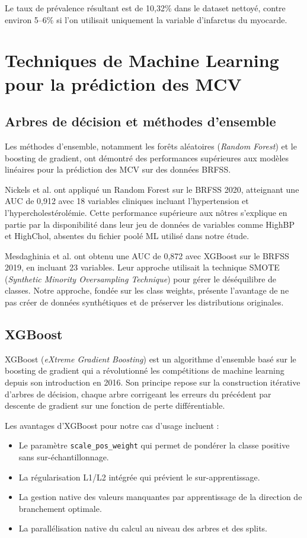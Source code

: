Le taux de prévalence résultant est de 10,32\% dans le dataset nettoyé, contre environ 5--6\% si l'on utilisait uniquement la variable d'infarctus du myocarde.

\section{Techniques de Machine Learning pour la prédiction des MCV}

\subsection{Arbres de décision et méthodes d'ensemble}

Les méthodes d'ensemble, notamment les forêts aléatoires (\textit{Random Forest}) et le boosting de gradient, ont démontré des performances supérieures aux modèles linéaires pour la prédiction des MCV sur des données BRFSS.

Nickels et al. \cite{nickels2023} ont appliqué un Random Forest sur le BRFSS 2020, atteignant une AUC de 0,912 avec 18 variables cliniques incluant l'hypertension et l'hypercholestérolémie. Cette performance supérieure aux nôtres s'explique en partie par la disponibilité dans leur jeu de données de variables comme HighBP et HighChol, absentes du fichier poolé ML utilisé dans notre étude.

Mesdaghinia et al. \cite{mesdaghinia2023} ont obtenu une AUC de 0,872 avec XGBoost sur le BRFSS 2019, en incluant 23 variables. Leur approche utilisait la technique SMOTE (\textit{Synthetic Minority Oversampling Technique}) pour gérer le déséquilibre de classes. Notre approche, fondée sur les class weights, présente l'avantage de ne pas créer de données synthétiques et de préserver les distributions originales.

\subsection{XGBoost}

XGBoost (\textit{eXtreme Gradient Boosting}) \cite{chen_xgboost} est un algorithme d'ensemble basé sur le boosting de gradient qui a révolutionné les compétitions de machine learning depuis son introduction en 2016. Son principe repose sur la construction itérative d'arbres de décision, chaque arbre corrigeant les erreurs du précédent par descente de gradient sur une fonction de perte différentiable.

Les avantages d'XGBoost pour notre cas d'usage incluent :
\begin{itemize}
    \item Le paramètre \texttt{scale\_pos\_weight} qui permet de pondérer la classe positive sans sur-échantillonnage.
    \item La régularisation L1/L2 intégrée qui prévient le sur-apprentissage.
    \item La gestion native des valeurs manquantes par apprentissage de la direction de branchement optimale.
    \item La parallélisation native du calcul au niveau des arbres et des splits.
\end{itemize}

